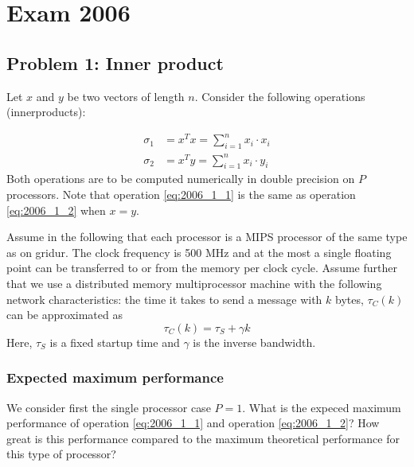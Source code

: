 
\section{Exam 2006} %
\label{sec:exam_2006}

\subsection{Problem 1: Inner product} %
\label{sub:problem_1_inner_product}

\begin{question}
  Let $x$ and $y$ be two vectors of length $n$. Consider the following operations (innerproducts):

  \begin{align}
    \sigma_1 &= x^T x = \sum_{i=1}^n x_i \cdot x_i \label{eq:2006_1_1} \\
    \sigma_2 &= x^T y = \sum_{i=1}^n x_i \cdot y_i \label{eq:2006_1_2}
  \end{align}
  Both operations are to be computed numerically in double precision on $P$ processors. Note that operation \eqref{eq:2006_1_1} is the same as operation \eqref{eq:2006_1_2} when $x=y$.

  Assume in the following that each processor is a MIPS processor of the same type as on gridur. The clock frequency is 500 MHz and at the most a single floating point can be transferred to or from the memory per clock cycle. Assume further that we use a distributed memory multiprocessor machine with the following network characteristics: the time it takes to send a message with $k$ bytes, $\tau_C(k)$ can be approximated as
  \begin{equation}
    \tau_C(k) = \tau_S + \gamma k
  \end{equation}
  Here, $\tau_S$ is a fixed startup time and $\gamma$ is the inverse bandwidth.
\end{question}

\subsubsection{Expected maximum performance} %
\label{ssub:expected_maximum_performance}

\begin{question}
  We consider first the single processor case $P=1$. What is the expeced maximum performance of operation \eqref{eq:2006_1_1} and operation \eqref{eq:2006_1_2}? How great is this performance compared to the maximum theoretical performance for this type of processor?
\end{question}

